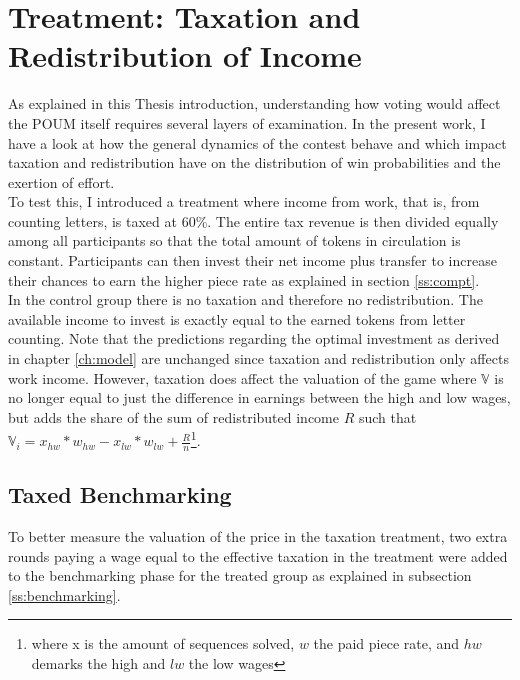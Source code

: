     
    \section{Treatment: Taxation and Redistribution of Income}
    \label{sec:treat}
    
    As explained in this Thesis introduction, understanding how voting would affect the POUM itself requires several layers of examination. In the present work, I have a look at how the general dynamics of the contest behave and which impact taxation and redistribution have on the distribution of win probabilities and the exertion of effort.\\
    
    To test this, I introduced a treatment where income from work, that is, from counting letters, is taxed at 60\%. The entire tax revenue is then divided equally among all participants so that the total amount of tokens in circulation is constant. Participants can then invest their net income plus transfer to increase their chances to earn the higher piece rate as explained in section \ref{ss:compt}.\\
    
    In the control group there is no taxation and therefore no redistribution. The available income to invest is exactly equal to the earned tokens from letter counting. Note that the predictions regarding the optimal investment as derived in chapter \ref{ch:model} are unchanged since taxation and redistribution only affects work income. However, taxation does affect the valuation of the game where $\mathbb{V}$ is no longer equal to just the difference in earnings between the high and low wages, but adds the share of the sum of redistributed income $R$ such that $\mathbb{V}_i = x_{hw}*w_{hw} - x_{lw}*w_{lw} + \frac{R}{n}$\footnote{where x is the amount of sequences solved, $w$ the paid piece rate, and $hw$ demarks the high and $lw$ the low wages}.  
    
    \subsection{Taxed Benchmarking}
    \label{ss:tax_bench}
    
    To better measure the valuation of the price in the taxation treatment, two extra rounds paying a wage equal to the effective taxation in the treatment were added to the benchmarking phase for the treated group as explained in subsection \ref{ss:benchmarking}.\\
    
